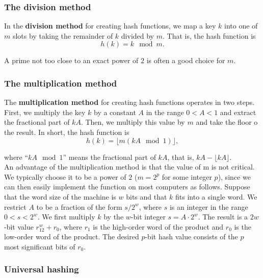 \documentclass[12pt]{article}
\begin{document}
\subsubsection{The division method}

In the \textbf {division method} for creating hash functions, we map a key $k$ into one of $m$ slots by taking the remainder of $k$ divided by $m$. That is, the hash function is
\begin{equation*}
  h(k) = k \mod m.
\end{equation*}

A prime not too close to an exact power of $2$ is often a good choice for $m$.

\subsubsection{The multiplication method}

The \textbf {multiplication method} for creating hash functions operates in two steps. First, we multiply the key $k$ by a constant $A$ in the range $0 < A < 1$ and extract the fractional part of $kA$. Then, we multiply this value by $m$ and take the floor o the result. In short, the hash function is
\begin{equation*}
  h(k) = \lfloor m (kA \mod 1) \rfloor,
\end{equation*}

where ``$kA \mod 1$'' means the fractional part of $kA$, that is, $kA - \lfloor kA \rfloor$. \\

An advantage of the multiplication method is that the value of m is not critical. We typically choose it to be a power of $2$ ($m = 2^p$ for some integer $p$), since we can then easily implement the function on most computers as follows. Suppose that the word size of the machine is $w$ bits and that $k$ fits into a single word. We restrict $A$ to be a fraction of the form $s/2^w$, where $s$ is an integer in the range $0 < s < 2^w$. We first multiply $k$ by the $w$-bit integer $s = A \cdot 2^w$. The result is a $2w$-bit value $r_12^w+r_0$, where $r_1$ is the high-order word of the product and $r_0$ is the low-order word of the product. The desired $p$-bit hash value consists of the $p$ most significant bits of $r_0$.

\subsubsection{Universal hashing}
\end{document}
